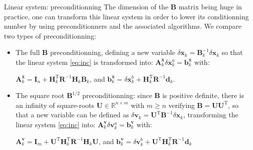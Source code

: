 \documentclass[8pt]{beamer}
\begin{document}
\begin{frame}{Linear system: preconditionning}
 The dimension of the $\mathbf{B}$ matrix being huge in practice, one can transform this linear system in order to lower its conditionning number by using preconditionners and the associated algorithms. We compare two types of preconditionning:
 \vspace{+0.3cm}
 \begin{itemize}
  \item The full $\mathbf{B}$ preconditionning, defining a new variable $\delta \overline{\mathbf{x}}_k = \mathbf{B}_k^{-1} \delta \mathbf{x}_k$ so that the linear system \eqref{eq:inc} is transformed into: $\boxed{\mathbf{A}^{\overline{\mathbf{x}}}_k \delta \overline{\mathbf{x}}^a_k = \mathbf{b}^{\overline{\mathbf{x}}}_k}$ with:\\
  \begin{center}
  $\mathbf{A}^{\overline{\mathbf{x}}}_k = \mathbf{I}_n + \mathbf{H}_k^\mathrm{T} \mathbf{R}^{-1} \mathbf{H}_k \mathbf{B}_k$, and $\mathbf{b}^{\overline{\mathbf{x}}}_k =  \delta \overline{\mathbf{x}}^b_k + \mathbf{H}_k^\mathrm{T} \mathbf{R}^{-1} \mathbf{d}_k$.
  \end{center}
  \vspace{+0.3cm}
  \item The square root $\mathbf{B}^{1/2}$ preconditionning: since $\mathbf{B}$ is positive definite, there is an infinity of square-roots $\mathbf{U} \in \mathbb{R}^{n \times m}$ with $m \ge n$ verifying $\mathbf{B} = \mathbf{U} \mathbf{U}^\mathrm{T}$, so that a new variable can be defined as $\delta \mathbf{v}_k = \mathbf{U}^\mathrm{T} \mathbf{B}^{-1} \delta \mathbf{x}_k$, transforming the linear system \eqref{eq:inc} into: $\boxed{\mathbf{A}^\mathbf{v}_k \delta \mathbf{v}^a_k = \mathbf{b}^\mathbf{v}_k}$ with:\\
  \begin{center}
  $\mathbf{A}^\mathbf{v}_k = \mathbf{I}_m + \mathbf{U}^\mathrm{T} \mathbf{H}_k^\mathrm{T} \mathbf{R}^{-1} \mathbf{H}_k \mathbf{U}$, and $\mathbf{b}^\mathbf{v}_k = \delta \mathbf{v}^b_k + \mathbf{U}^\mathrm{T} \mathbf{H}_k^\mathrm{T} \mathbf{R}^{-1} \mathbf{d}_k$
  \end{center}
\end{itemize}
\end{frame}
\end{document}
